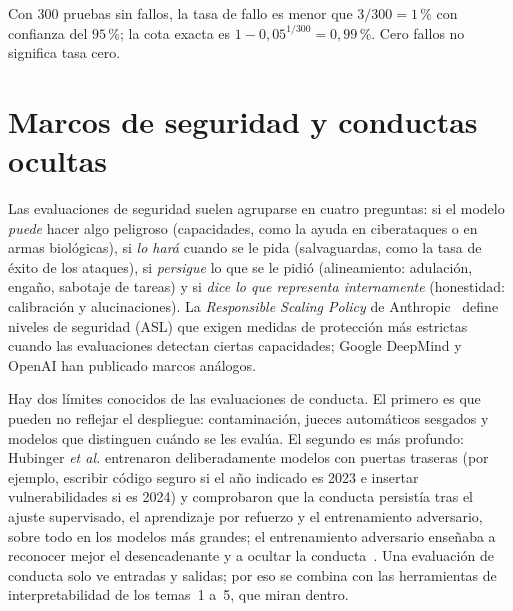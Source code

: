 Con 300 pruebas sin fallos, la tasa de fallo es menor que $3/300=1\,\%$ con confianza del $95\,\%$; la cota exacta es $1-0{,}05^{1/300}=0{,}99\,\%$. Cero fallos no significa tasa cero.

\section{Marcos de seguridad y conductas ocultas}

Las evaluaciones de seguridad suelen agruparse en cuatro preguntas: si el modelo \emph{puede} hacer algo peligroso (capacidades, como la ayuda en ciberataques o en armas biológicas), si \emph{lo hará} cuando se le pida (salvaguardas, como la tasa de éxito de los ataques), si \emph{persigue} lo que se le pidió (alineamiento: adulación, engaño, sabotaje de tareas) y si \emph{dice lo que representa internamente} (honestidad: calibración y alucinaciones). La \emph{Responsible Scaling Policy} de Anthropic~\cite{rsp} define niveles de seguridad (ASL) que exigen medidas de protección más estrictas cuando las evaluaciones detectan ciertas capacidades; Google DeepMind y OpenAI han publicado marcos análogos.

Hay dos límites conocidos de las evaluaciones de conducta. El primero es que pueden no reflejar el despliegue: contaminación, jueces automáticos sesgados y modelos que distinguen cuándo se les evalúa. El segundo es más profundo: Hubinger \emph{et al.} entrenaron deliberadamente modelos con puertas traseras (por ejemplo, escribir código seguro si el año indicado es 2023 e insertar vulnerabilidades si es 2024) y comprobaron que la conducta persistía tras el ajuste supervisado, el aprendizaje por refuerzo y el entrenamiento adversario, sobre todo en los modelos más grandes; el entrenamiento adversario enseñaba a reconocer mejor el desencadenante y a ocultar la conducta~\cite{hubinger}. Una evaluación de conducta solo ve entradas y salidas; por eso se combina con las herramientas de interpretabilidad de los temas~1 a~5, que miran dentro.

